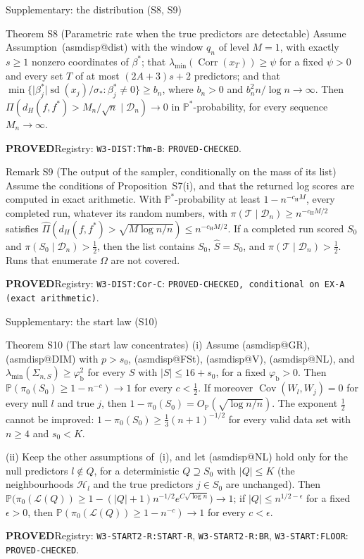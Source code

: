 \documentclass[aspectratio=169]{beamer}
\makeatletter
\newcommand{\asmdisp}[1]{\csname asmdisp@#1\endcsname}
\newcommand{\as}[1]{\textup{(\asmdisp{#1})}}
\newcommand{\abs}[1]{\lvert #1\rvert}
\renewcommand{\P}{\mathbb{P}}
\DeclareMathOperator{\Cov}{Cov}
\DeclareMathOperator{\Corr}{Corr}
\DeclareMathOperator{\sd}{sd}
\newcommand{\OP}{O_{\P}}
\newcommand{\lmin}{\lambda_{\min}}
\newcommand{\sigs}{\sigma_*}
\newcommand{\bstar}{\beta^*}
\newcommand{\Sz}{S_0}
\newcommand{\sz}{s_0}
\newcommand{\rn}{\sqrt{\log n/n}}
\newcommand{\Hl}{\mathcal H}
\newcommand{\Dn}{\mathcal D_n}
\newcommand{\Om}{\Omega}
\newcommand{\Shat}{\hat S}
\newcommand{\Lat}{\mathcal L}
\newcommand{\rid}[1]{\texttt{#1}}
\makeatother
\begin{document}
\begin{frame}{Supplementary: the distribution (S8, S9)}
\footnotesize
\begin{block}{Theorem S8 (Parametric rate when the true predictors are detectable)}
Assume Assumption~\as{dist} with the window $q_n$ of level $M=1$, with exactly $s\ge1$ nonzero coordinates of $\bstar$;
that $\lmin(\Corr(x_T))\ge\psi$ for a fixed $\psi>0$ and every set $T$ of at most $(2A+3)s+2$ predictors; and that
$\min\{\abs{\beta^*_j}\sd(x_j)/\sigs:\beta^*_j\neq0\}\ge b_n$, where $b_n>0$ and $b_n^2n/\log n\to\infty$. Then
$\Pi(d_H(f,f^*)>M_n/\sqrt n\mid\Dn)\to0$ in $\P^*$-probability, for every sequence $M_n\to\infty$.
\end{block}
{\footnotesize \textbf{PROVED}\quad Registry: \rid{W3-DIST:Thm-B}: \rid{PROVED-CHECKED}.}

\begin{block}{Remark S9 (The output of the sampler, conditionally on the mass of its list)}
Assume the conditions of Proposition~S7(i), and that the returned log scores are computed in exact
arithmetic. With $\P^*$-probability at least $1-n^{-c_{\mathrm H}M}$, every completed run, whatever its random numbers, with
$\pi(\mathcal T\mid\Dn)\ge n^{-c_{\mathrm H}M/2}$ satisfies $\hat\Pi(d_H(f,f^*)>\sqrt{M\log n/n})\le n^{-c_{\mathrm H}M/2}$. If a
completed run scored $\Sz$ and $\pi(\Sz\mid\Dn)>\tfrac12$, then the list contains $\Sz$, $\Shat=\Sz$, and $\pi(\mathcal
T\mid\Dn)>\tfrac12$. Runs that enumerate $\Om$ are not covered.
\end{block}
{\footnotesize \textbf{PROVED}\quad Registry: \rid{W3-DIST:Cor-C}: \rid{PROVED-CHECKED, conditional on EX-A (exact arithmetic)}.}

\end{frame}

\begin{frame}{Supplementary: the start law (S10)}
\footnotesize
\begin{block}{Theorem S10 (The start law concentrates)}
\textup{(i)} Assume \as{GR}, \as{DIM} with $p>\sz$, \as{FSt}, \as{V}, \as{NL}, and $\lmin(\Sigma_{n,S})\ge\varphi_{\mathrm b}^2$
for every $S$ with $\abs{S}\le16+\sz$, for a fixed $\varphi_{\mathrm b}>0$. Then $\P(\pi_0(\Sz)\ge1-n^{-c})\to1$ for every
$c<\tfrac12$. If moreover $\Cov(W_l,W_j)=0$ for every null $l$ and true $j$, then $1-\pi_0(\Sz)=\OP(\rn)$. The exponent
$\tfrac12$ cannot be improved: $1-\pi_0(\Sz)\ge\tfrac13(n+1)^{-1/2}$ for every valid data set with $n\ge4$ and $\sz<K$.

\textup{(ii)} Keep the other assumptions of~(i), and let \as{NL} hold only for the null predictors $l\notin Q$, for a
deterministic $Q\supseteq\Sz$ with $\abs{Q}\le K$ (the neighbourhoods $\Hl_l$ and the true predictors $j\in\Sz$ are
unchanged). Then $\P\big(\pi_0(\Lat(Q))\ge1-(\abs{Q}+1)n^{-1/2}e^{C\sqrt{\log n}}\big)\to1$; if $\abs{Q}\le
n^{1/2-\epsilon}$ for a fixed $\epsilon>0$, then $\P(\pi_0(\Lat(Q))\ge1-n^{-c})\to1$ for every $c<\epsilon$.
\end{block}
{\footnotesize \textbf{PROVED}\quad Registry: \rid{W3-START2-R:START-R}, \rid{W3-START2-R:BR}, \rid{W3-START:FLOOR}: \rid{PROVED-CHECKED}.}

\end{frame}
\end{document}
